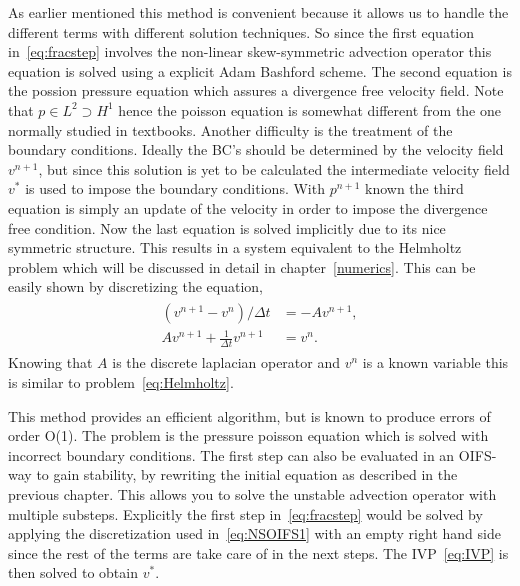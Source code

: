 As earlier mentioned this method is convenient because it allows us to handle the different 
terms with different solution techniques. So since the first equation in~\ref{eq:fracstep}
involves the non-linear skew-symmetric advection operator this equation is solved using a 
explicit Adam Bashford scheme. The second equation is the possion pressure equation which
assures a divergence free velocity field. Note that $p\in L^2\supset H^1$ hence the poisson equation 
is somewhat different from the one normally studied in textbooks. Another difficulty is the 
treatment of the boundary conditions. Ideally the BC's should be determined by the velocity 
field $v^{n+1}$, but since this solution is yet to be calculated the intermediate velocity field 
$v^{*}$ is used to impose the boundary conditions. With $p^{n+1}$ known the third equation is 
simply an update of the velocity in order to impose the divergence free condition. Now the last
equation is solved implicitly due to its nice symmetric structure. This results in a system 
equivalent to the Helmholtz problem which will be discussed in detail in chapter~\ref{numerics}.
This can be easily shown by discretizing the equation, 
\begin{align}
    \begin{split}
    (v^{n+1}-v^{n})/\Delta t  &= -Av^{n+1},\\
    Av^{n+1}+\frac{1}{\Delta t} v^{n+1} &= v^{n}.
    \end{split}
    \label{eq:fracHelm}
\end{align}
Knowing that $A$ is the discrete laplacian operator and $v^n$ is a known variable this is 
similar to problem~\ref{eq:Helmholtz}.


This method provides an efficient algorithm, but is known to produce errors of order O(1).
The problem is the pressure poisson equation which is solved with incorrect boundary 
conditions. The first step can also be evaluated in an OIFS-way to gain stability,
by rewriting the initial equation as described in the previous chapter. This allows you 
to solve the unstable advection operator with multiple substeps. Explicitly the first step 
in~\ref{eq:fracstep} would be solved by applying the discretization used in~\ref{eq:NSOIFS1}
with an empty right hand side since the rest of the terms are take care of in the next steps. 
The IVP~\ref{eq:IVP} is then solved to obtain $v^{*}$.


